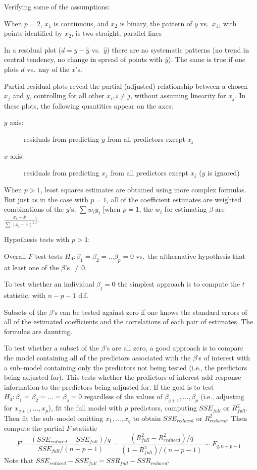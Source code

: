 Verifying some of the assumptions:
\be
\item	When $p=2$, $x_{1}$ is continuous, and $x_{2}$ is binary, the
		pattern of $y$ vs.\ $x_{1}$, with points identified by
		$x_{2}$, is two straight, parallel lines
\item	In a residual plot ($d = y - \hat{y}$ vs.\ $\hat{y}$) there are no
		systematic patterns (no trend in central tendency, no change
		in spread of points with $\hat{y}$).  The same is true if one
		plots $d$ vs.\ any of the $x$'s.
\item	Partial residual plots reveal the partial (adjusted)
relationship between a chosen $x_{j}$ and $y$, controlling for all
other $x_{i}, i \neq j$, without assuming linearity for $x_{j}$.  In
these plots, the following quantities appear on the axes:
	\begin{description}
	\item[$y$ axis:] residuals from predicting $y$ from all predictors
		except $x_j$
	\item[$x$ axis:] residuals from predicting $x_j$ from all
		predictors except $x_{j}$ ($y$ is ignored)
	\end{description}
\ee

When $p>1$, least squares estimates are obtained using more complex
formulas.  But just as in the case with $p=1$, all of the coefficient
estimates are weighted combinations of the $y$'s, $\sum w_{i}y_{i}$
[when $p=1$, the $w_i$ for estimating $\beta$ are
$\frac{x_{i}-\bar{x}}{\sum(x_{i}-\bar{x})^{2}}$].

Hypothesis tests with $p>1$:
\bi
\item	Overall $F$ test tests $H_{0}: \beta_{1} = \beta_{2} = \ldots
		\beta_{p} = 0$ vs.\ the althernative hypothesis that at least one of
		the $\beta$'s $\neq 0$.
\item	To test whether an individual $\beta_{j}=0$ the simplest
		approach is to compute the $t$ statistic, with $n-p-1$ d.f.
\item	Subsets of the $\beta$'s can be tested against zero if one
		knows the standard errors of all of the estimated coefficients
		and the correlations of each pair of estimates.  The formulas
		are daunting.
\item	To test whether a subset of the $\beta$'s are all zero, a good
		approach is to compare the model containing all of the
		predictors associated with the $\beta$'s of interest with a
		sub--model containing only the predictors not being tested
		(i.e., the predictors being adjusted for).  This tests whether
		the predictors of interest add response information to the
		predictors being adjusted for.  If the goal is to
		test $H_{0}:\beta_{1}=\beta_{2}=\ldots=\beta_{q}=0$ regardless
		of the values of $\beta_{q+1},\ldots,\beta_{p}$ (i.e.,
		adjusting for $x_{q+1},\ldots,x_{p}$), fit the full model with
		$p$ predictors, computing $SSE_{full}$ or $R^{2}_{full}$.  Then
		fit the sub--model omitting $x_{1},\ldots,x_{q}$ to obtain
		$SSE_{reduced}$ or $R^{2}_{reduced}$.  Then compute the
		partial $F$ statistic
		\[
		F = \frac{(SSE_{reduced} - SSE_{full})/q}{SSE_{full}/(n-p-1)}
		= \frac{(R^{2}_{full} - R^{2}_{reduced})/q}{(1 -
		R^{2}_{full})/(n-p-1)} \sim F_{q,n-p-1}
		\]
		Note that $SSE_{reduced} - SSE_{full} = SSR_{full} - SSR_{reduced}$.
\ei

